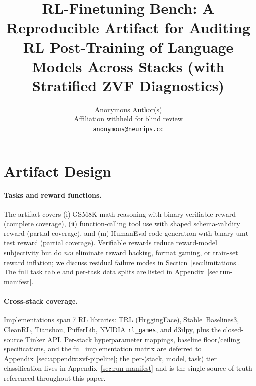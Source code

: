 \documentclass{article}
\title{RL-Finetuning Bench: A Reproducible Artifact for Auditing RL Post-Training of Language Models Across Stacks (with Stratified ZVF Diagnostics)}
\author{%
  Anonymous Author(s)\\
  Affiliation withheld for blind review\\
  \texttt{anonymous@neurips.cc}%
}
\begin{document}
\sloppy
{}
\hfuzz=2pt

\maketitle






\section{Artifact Design}
\label{sec:benchmark}

\paragraph{Tasks and reward functions.}
The artifact covers (i) GSM8K math reasoning with binary verifiable reward
(complete coverage), (ii) function-calling tool use with shaped
schema-validity reward (partial coverage), and (iii) HumanEval code
generation with binary unit-test reward (partial coverage). Verifiable
rewards reduce reward-model subjectivity but do \emph{not} eliminate
reward hacking, format gaming, or train-set reward inflation; we discuss
residual failure modes in Section~\ref{sec:limitations}. The full task
table and per-task data splits are listed in
Appendix~\ref{sec:run-manifest}.

\paragraph{Cross-stack coverage.}
Implementations span 7 RL libraries: TRL (HuggingFace),
Stable~Baselines3, CleanRL, Tianshou, PufferLib, NVIDIA \texttt{rl\_games},
and d3rlpy, plus the closed-source Tinker API. Per-stack
hyperparameter mappings, baseline floor/ceiling specifications, and the
full implementation matrix are deferred to
Appendix~\ref{sec:appendix:zvf-pipeline}; the per-(stack, model, task)
tier classification lives in Appendix~\ref{sec:run-manifest} and is the
single source of truth referenced throughout this paper.
\end{document}
